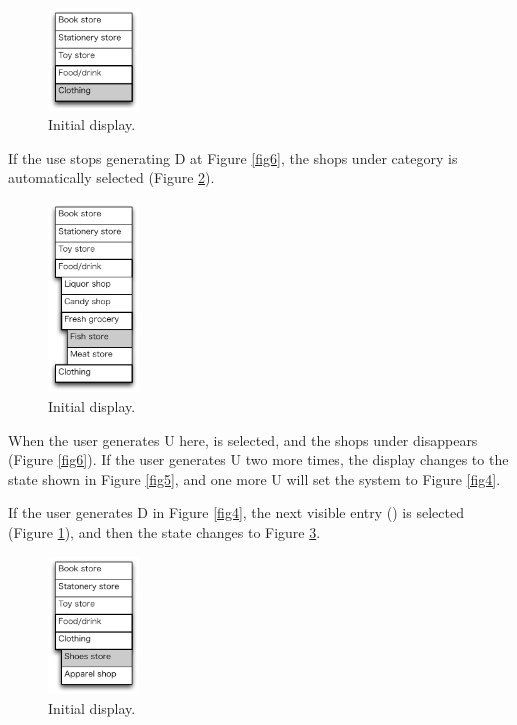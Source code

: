 \documentclass{article}
\begin{document}
\begin{figure}[H]
\centerline{\includegraphics[width=24mm,bb=0 0 139 157]{figures/fig8.pdf}}
\caption{Initial display.}
\label{fig8}
\end{figure}

If the use stops generating D at Figure \ref{fig6},
the shops under category  is automatically selected (Figure \ref{fig7}).

\begin{figure}[H]
\centerline{\includegraphics[width=24mm,bb=0 0 139 292]{figures/fig7.pdf}}
\caption{Initial display.}
\label{fig7}
\end{figure}

When the user generates U here,  is selected,
and the shops under  disappears (Figure \ref{fig6}).
If the user generates U two more times, the display changes to the state
shown in Figure \ref{fig5},
and one more U will set the system to Figure \ref{fig4}.

If the user generates D in Figure \ref{fig4}, the next visible entry
() is selected (Figure \ref{fig8}), and then the state changes to Figure \ref{fig9}.

\begin{figure}[H]
\centerline{\includegraphics[width=24mm,bb=0 0 139 211]{figures/fig9.pdf}}
\caption{Initial display.}
\label{fig9}
\end{figure}
\end{document}
